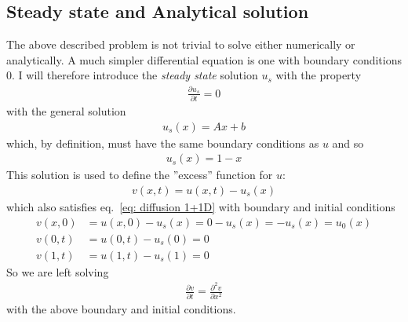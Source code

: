 \documentclass[twoside, 11pt]{article}
\begin{document}
	\subsection{Steady state and Analytical solution}
		The above described problem is not trivial to solve either numerically or analytically. A much simpler differential equation is one with boundary conditions 0. I will therefore introduce the \textit{steady state} solution $u_s$ with the property
		\begin{align*}
			\frac{\partial u_s}{\partial t} = 0
		\end{align*}
		with the general solution
		\begin{align*}
			u_s(x) = Ax+b
		\end{align*}
		which, by definition, must have the same boundary conditions as $u$ and so
		\begin{align*}
			u_s(x) = 1-x
		\end{align*}
		This solution is used to define the ''excess'' function for $u$:
		\begin{align*}
			v(x, t) = u(x, t) - u_s(x)
		\end{align*}
		which also satisfies eq.~\eqref{eq: diffusion 1+1D} with boundary and initial conditions 
		\begin{align*}
			v(x, 0) &= u(x, 0) - u_s(x) = 0 - u_s(x) = -u_s(x) = u_0(x)\\
			v(0, t) &= u(0, t) - u_s(0) = 0 \\
			v(1, t) &= u(1, t) - u_s(1) = 0
		\end{align*}
		So we are left solving
		\begin{align}
			\frac{\partial v}{\partial t} = \frac{\partial ^2 v}{\partial x^2} \label{eq: diffusion eq. excess}
		\end{align}
		with the above boundary and initial conditions.
		
\end{document}
